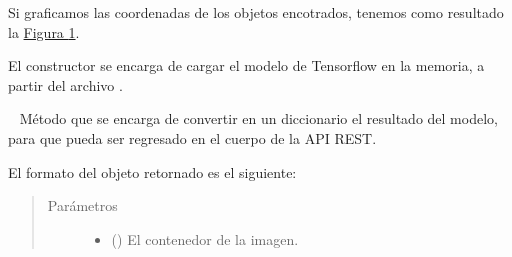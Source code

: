 \begin{fulllineitems}
Si graficamos las coordenadas de los objetos encotrados, tenemos como resultado
la \hyperref[\detokenize{chapter_two/desc_cloudnao:obj-detec-after}]{Figura \ref{\detokenize{chapter_two/desc_cloudnao:obj-detec-after}}}.

\begin{figure}[htbp]
\centering

\noindent{}
\label{\detokenize{chapter_two/desc_cloudnao:obj-detec-after}}\end{figure}

El constructor se encarga de cargar el modelo de Tensorflow en la
memoria, a partir del archivo .

\begin{fulllineitems}
\label{\detokenize{chapter_two/desc_cloudnao:app.tf_models.object_detection.ObjectDetectionTensorflow.create_response}}~
Método que se encarga de convertir en un diccionario el resultado del
modelo, para que pueda ser regresado en el cuerpo de la API REST.

El formato del objeto retornado es el siguiente:

\begin{sphinxVerbatim}[commandchars=\\\{\}]
\PYG{p}{[}
          
         
         
          
          
          
\PYG{p}{]}
\end{sphinxVerbatim}
\begin{quote}\begin{description}
\item[{Parámetros}] \leavevmode\begin{itemize}
\item {} 
 () \textendash{} El contenedor de la imagen.


\end{itemize}
\end{description}
\end{quote}
\end{fulllineitems}
\end{fulllineitems}
